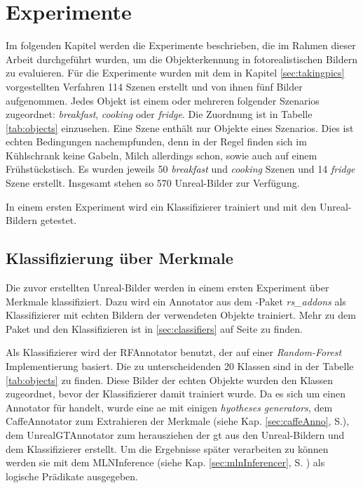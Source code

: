 \graphicspath{{./images/}}      
\def\CHAPTERONE{./chapters/Chapter-1} 

\chapter{Experimente}
\label{chap:experiments}
%	
\glsresetall
Im folgenden Kapitel werden die Experimente beschrieben, die im Rahmen dieser Arbeit durchgeführt wurden, um die Objekterkennung in fotorealistischen Bildern zu evaluieren. Für die Experimente wurden mit dem in Kapitel \ref{sec:takingpics} vorgestellten Verfahren 114 Szenen erstellt und von ihnen fünf Bilder aufgenommen. Jedes Objekt ist einem oder mehreren folgender Szenarios zugeordnet: \textit{breakfast}, \textit{cooking} oder \textit{fridge}. Die Zuordnung ist in Tabelle \ref{tab:objects} einzusehen. Eine Szene enthält nur Objekte eines Szenarios. Dies ist echten Bedingungen nachempfunden, denn in der Regel finden sich im Kühlschrank keine Gabeln, Milch allerdings schon, sowie auch auf einem Frühstückstisch. Es wurden jeweils 50 \textit{breakfast} und \textit{cooking} Szenen und 14 \textit{fridge} Szene erstellt. Insgesamt stehen so 570 Unreal-Bilder zur Verfügung. \par
In einem ersten Experiment wird ein Klassifizierer trainiert und mit den Unreal-Bildern getestet.  


\section{Klassifizierung über Merkmale}
\label{sec:classificationExperiment}
Die zuvor erstellten Unreal-Bilder werden in einem ersten Experiment über Merkmale klassifiziert. Dazu wird ein Annotator aus dem \robosherlock-Paket \textit{rs\_addons} als Klassifizierer mit echten Bildern der verwendeten Objekte trainiert. Mehr zu dem Paket und den Klassifizieren ist in \ref{sec:classifiers} auf Seite \pageref{sec:classifiers} zu finden. \par

Als Klassifizierer wird der RFAnnotator benutzt, der auf einer \textit{Random-Forest} Implementierung basiert. Die zu unterscheidenden 20 Klassen sind in der Tabelle \ref{tab:objects} zu finden. Diese Bilder der echten Objekte wurden den Klassen zugeordnet, bevor der Klassifizierer damit trainiert wurde. Da es sich um einen Annotator für \robosherlock handelt, wurde eine \gls{ae} mit einigen \textit{hyotheses generators}, dem CaffeAnnotator zum Extrahieren der Merkmale (siehe Kap. \ref{sec:caffeAnno}, S.\pageref{sec:caffeAnno}), dem UnrealGTAnnotator zum herausziehen der \gls{gt} aus den Unreal-Bildern und dem Klassifizierer erstellt. Um die Ergebnisse später verarbeiten zu können werden sie mit dem MLNInference (siehe Kap. \ref{sec:mlnInferencer}, S. \pageref{sec:mlnInferencer}) als logische Prädikate ausgegeben. \par
 

